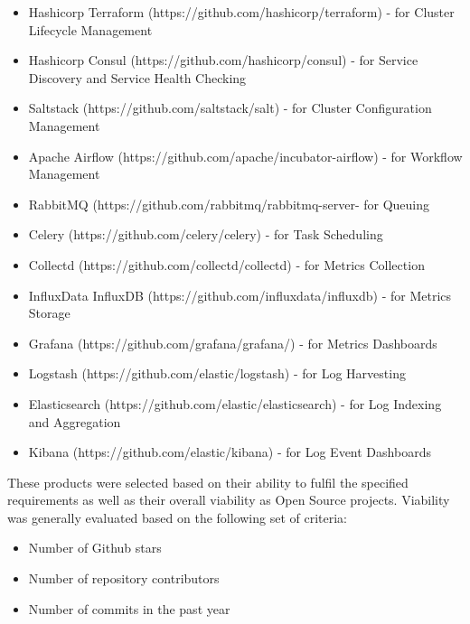 \begin{itemize}
\item Hashicorp Terraform\autocite{Terraform_by_HashiCorp_2016-10-31} (https://github.com/hashicorp/terraform) - for Cluster Lifecycle Management
\item Hashicorp Consul\autocite{Consul_by_HashiCorp} (https://github.com/hashicorp/consul) - for Service Discovery and Service Health Checking
\item Saltstack\autocite{SaltStack_2016-10-31} (https://github.com/saltstack/salt) - for Cluster Configuration Management
\item Apache Airflow\autocite{Apache_Airflow__2016-10-31} (https://github.com/apache/incubator-airflow) - for Workflow Management
\item RabbitMQ\autocite{RabbitMQ_2016-10-31} (https://github.com/rabbitmq/rabbitmq-server- for Queuing
\item Celery\autocite{Celery_2016-10-31} (https://github.com/celery/celery) - for Task Scheduling
\item Collectd\autocite{collectd_2016-10-31} (https://github.com/collectd/collectd) - for Metrics Collection
\item InfluxData InfluxDB\autocite{InfluxDB} (https://github.com/influxdata/influxdb) - for Metrics Storage
\item Grafana\autocite{Grafana.net} (https://github.com/grafana/grafana/) - for Metrics Dashboards
\item Logstash\autocite{Logstash} (https://github.com/elastic/logstash) - for Log Harvesting
\item Elasticsearch\autocite{Elasticsearch} (https://github.com/elastic/elasticsearch) - for Log Indexing and Aggregation
\item Kibana\autocite{Kibana} (https://github.com/elastic/kibana) - for Log Event Dashboards
\end{itemize}

These products were selected based on their ability to fulfil the specified requirements as well as their overall viability as Open Source projects. Viability was generally evaluated based on the following set of criteria:

\begin{itemize}
\item Number of Github stars
\item Number of repository contributors
\item Number of commits in the past year
\end{itemize}

